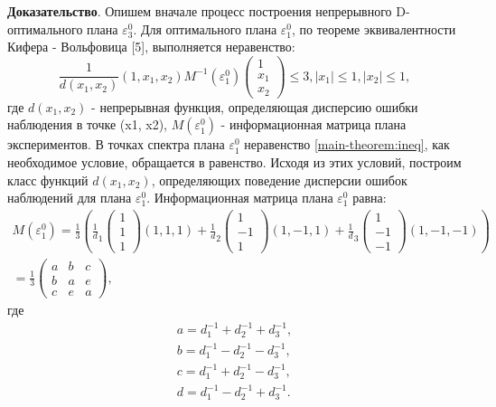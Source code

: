 	\textbf{Доказательство}.
	Опишем вначале процесс построения непрерывного D-оптимального плана $\varepsilon_3^0$.
	Для оптимального плана  $\varepsilon_1^{0}$, по теореме эквивалентности Кифера - Вольфовица [5], выполняется неравенство:
	\begin{equation}\label{main-theorem:ineq}
		\frac 1 {d(x_1, x_2)}
		(1, x_1, x_2)
		M^{-1}(\varepsilon_1^0)
		\begin{pmatrix}1 \\ x_1 \\ x_2 \end{pmatrix} \le 3,
		|x_1| \le 1, |x_2| \le 1,
	\end{equation}
	где $d(x_1, x_2)$ - непрерывная функция, определяющая дисперсию ошибки наблюдения в точке (x1, x2), $M(\varepsilon_1^{0})$ - информационная матрица плана экспериментов. В точках спектра плана $\varepsilon_1^{0}$ неравенство \eqref{main-theorem:ineq}, как необходимое условие, обращается в равенство. Исходя из этих условий, построим класс функций $d(x_1, x_2)$, определяющих поведение дисперсии ошибок наблюдений  для плана $\varepsilon_1^{0}$. Информационная матрица плана $\varepsilon_1^{0}$ равна:
	\begin{gather*}
		M(\varepsilon_1^0) = \frac 1 3 \left(
			\frac 1 d_1 \begin{pmatrix} 1 \\ 1 \\ 1 \end{pmatrix} (1, 1, 1) + 
			\frac 1 d_2 \begin{pmatrix} 1 \\ -1 \\ 1 \end{pmatrix} (1, -1, 1) + 
			\frac 1 d_3 \begin{pmatrix} 1 \\ -1 \\ -1 \end{pmatrix} (1, -1, -1)
		\right) \\ =
		\frac 1 3 
		\begin{pmatrix}
			a & b & c \\
			b & a & e \\
			c & e & a
		\end{pmatrix},
	\end{gather*}
	где
	\begin{equation}\label{main-theorem:defs} \begin{split}
		a=d_1^{-1}+d_2^{-1}+d_3^{-1},\\
		b=d_1^{-1}-d_2^{-1}-d_3^{-1},\\
		c=d_1^{-1}+d_2^{-1}-d_3^{-1},\\
		d=d_1^{-1}-d_2^{-1}+d_3^{-1}.
	\end{split}\end{equation}
